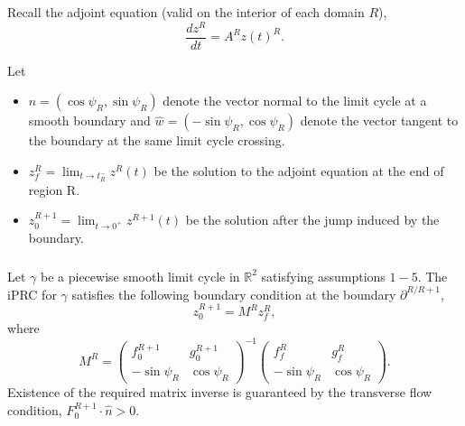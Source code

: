 \documentclass{beamer}
\renewcommand{\matrix}[2]{ \left(\begin{array}{#1} #2 \end{array}\right)}
\begin{document}
% 
% 
% 
% 
  
  \begin{frame}
  \frametitle{\insertsection}
   \framesubtitle{\insertsubsection}
   Recall the adjoint equation (valid on the interior of each domain $R$),
   \begin{equation}
    \frac{dz^R}{dt} = A^R z(t)^R.
   \end{equation}

    Let
    \begin{itemize}
     \item $\hat{n} = (\cos\psi_R, \sin\psi_R)$ denote the vector normal to the limit cycle at a smooth boundary and $\hat{w} = (-\sin\psi_R, \cos\psi_R)$ denote the vector tangent to the boundary at the same limit cycle crossing.
     \item $z_f^R=\lim_{t\to t_R^-}z^R(t)$ be the solution to the adjoint equation at the end of region R.
     \item $z_0^{R+1}=\lim_{t\to 0^+}z^{R+1}(t)$ be the solution after the jump induced by the boundary. 
    \end{itemize}
  \end{frame}

  \begin{frame}
   \frametitle{\insertsection}
   \framesubtitle{\insertsubsection}
\begin{theorem} Let $\gamma$ be a piecewise smooth limit cycle in $\mathbb{R}^2$ satisfying assumptions $1-5$.  The iPRC for $\gamma$ satisfies the following boundary condition at the boundary $\partial^{R/R+1}$,
 \begin{equation}
z_0^{R+1}=M^R z_f^R,
\end{equation}
where
\begin{equation}
M^R = \matrix{cc}{f_0^{R+1} & g_0^{R+1}\\
-\sin\psi_R & \cos\psi_R}^{-1}\matrix{cc}{f_f^R & g_f^R\\
-\sin\psi_R & \cos\psi_R}.
\end{equation}
Existence of the required matrix inverse is guaranteed by the transverse flow condition, $F_0^{R+1}\cdot \hat{n} > 0$.
\label{theorem}
\end{theorem}
\end{frame}
\end{document}
